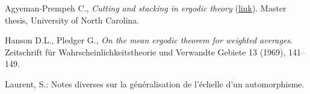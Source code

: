\documentclass[12pt,a4paper]{article}
\begin{document}
\begin{thebibliography}{99.}

Agyeman-Prempeh C., 
\emph{Cutting and stacking in ergodic theory} (\href{https://cdr.lib.unc.edu/indexablecontent/uuid:bfc41b0c-b048-440f-9a57-533e02ea4f76}{link}).
Master thesis, University of North Carolina. 

Hanson D.L., Pledger G.,
\emph{On the mean ergodic theorem for weighted averages}. 
Zeitschrift für Wahrscheinlichkeitstheorie und Verwandte Gebiete 13 (1969), 141--149.

Laurent, S.: 
Notes diverses sur la généralisation de l'échelle d'un automorphisme. 


\end{thebibliography}
\end{document}
